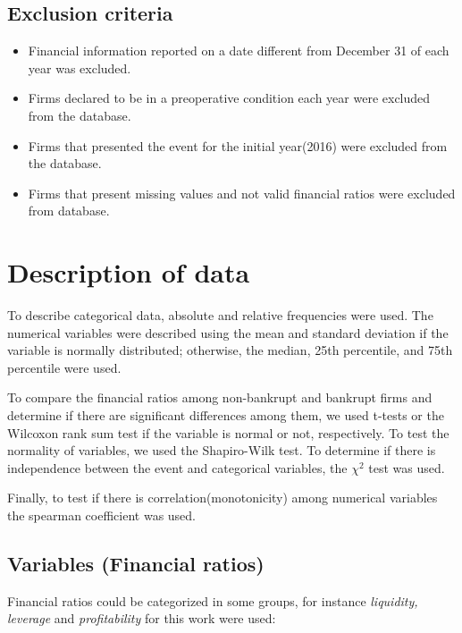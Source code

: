 \documentclass[journal]{IEEEtai}
\begin{document}
\subsection{Exclusion criteria}

\begin{itemize}

\item Financial information reported on a date different from December 31 of each year was excluded.

\item Firms declared to be in a preoperative condition each year were excluded from the database.

\item  Firms that presented the event for the initial year(2016) were excluded from the database.

\item Firms that present missing values and not valid financial ratios were excluded from database.
\end{itemize}


\section{Description of data}

To describe categorical data, absolute and relative frequencies were used. The numerical variables were described using the mean and standard deviation if the variable is normally distributed; otherwise, the median, 25th percentile, and 75th percentile were used.

To compare the financial ratios among non-bankrupt and bankrupt firms and determine if there are significant differences among them, we used t-tests or the Wilcoxon rank sum test if the variable is normal or not, respectively.
To test the normality of variables, we used the Shapiro-Wilk test. To determine if there is independence between the event and categorical variables, the $\chi^{2}$ test was used.

Finally, to test if there is correlation(monotonicity) among numerical variables the spearman coefficient was used.


\subsection{Variables  (Financial ratios)}
Financial ratios could be categorized in some groups, for instance \textit{liquidity, leverage} and \textit{profitability } for this work were used:
\end{document}
